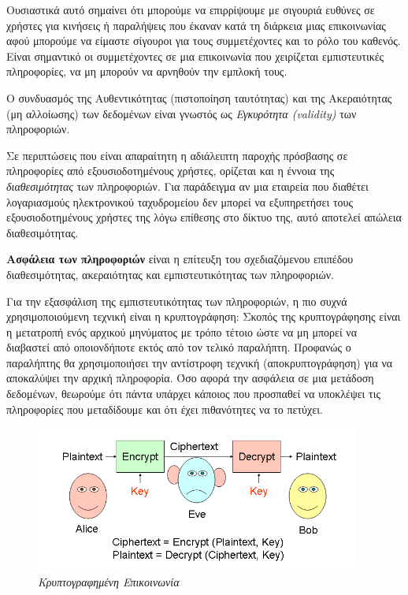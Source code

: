 \begin{itemize}
Ουσιαστικά αυτό σημαίνει ότι μπορούμε να επιρρίψουμε με σιγουριά ευθύνες σε χρήστες για κινήσεις ή παραλήψεις που έκαναν κατά τη διάρκεια μιας επικοινωνίας αφού μπορούμε να είμαστε σίγουροι για τους συμμετέχοντες και το ρόλο του καθενός. Είναι σημαντικό οι συμμετέχοντες σε μια επικοινωνία που χειρίζεται εμπιστευτικές πληροφορίες, να μη μπορούν να αρνηθούν την εμπλοκή τους. 

Ο συνδυασμός της Αυθεντικότητας (πιστοποίηση ταυτότητας) και της Ακεραιότητας (μη αλλοίωσης) των δεδομένων είναι γνωστός ως \emph{Εγκυρότητα (validity)} των πληροφοριών. 

Σε περιπτώσεις που είναι απαραίτητη η αδιάλειπτη παροχής πρόσβασης σε πληροφορίες από εξουσιοδοτημένους χρήστες, ορίζεται και η έννοια της \emph{διαθεσιμότητας} των πληροφοριών. Για παράδειγμα αν μια εταιρεία που διαθέτει λογαριασμούς ηλεκτρονικού ταχυδρομείου δεν μπορεί να εξυπηρετήσει τους εξουσιοδοτημένους χρήστες της λόγω επίθεσης στο δίκτυο της, αυτό αποτελεί απώλεια διαθεσιμότητας.
\end{itemize}

\begin{inthebox}
\textbf{Ασφάλεια των πληροφοριών} είναι η επίτευξη του σχεδιαζόμενου επιπέδου διαθεσιμότητας, ακεραιότητας και εμπιστευτικότητας των πληροφοριών.\\
\end{inthebox}

Για την εξασφάλιση της εμπιστευτικότητας των πληροφοριών, η πιο συχνά χρησιμοποιούμενη τεχνική είναι η κρυπτογράφηση: Σκοπός της κρυπτογράφησης είναι η μετατροπή ενός αρχικού μηνύματος με τρόπο τέτοιο ώστε να μη μπορεί να διαβαστεί από οποιονδήποτε εκτός από τον τελικό παραλήπτη. Προφανώς ο παραλήπτης θα χρησιμοποιήσει την αντίστροφη τεχνική (αποκρυπτογράφηση) για να αποκαλύψει την αρχική πληροφορία. Όσο αφορά την ασφάλεια σε μια μετάδοση δεδομένων, θεωρούμε ότι πάντα υπάρχει κάποιος που προσπαθεί να υποκλέψει τις πληροφορίες που μεταδίδουμε και ότι έχει πιθανότητες να το πετύχει.

\begin{figure}[!ht]
 \centering
 \includegraphics[width=0.95\textwidth]{images/chapter8/8-1}
 \caption {\textsl{Κρυπτογραφημένη Επικοινωνία}}
 \label{8-1}
\end{figure}

